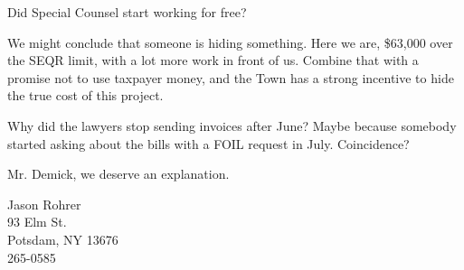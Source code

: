 \documentclass[12pt]{article}
\begin{document}
Did Special Counsel start working for free?

We might conclude that someone is hiding something.  Here we are, \$63,000 over the SEQR limit, with a lot more work in front of us.  Combine that with a promise not to use taxpayer money, and the Town has a strong incentive to hide the true cost of this project.

Why did the lawyers stop sending invoices after June?  Maybe because somebody started asking about the bills with a FOIL request in July.  Coincidence?

Mr. Demick, we deserve an explanation.

\vspace{0.5in}
\noindent Jason Rohrer\\
93 Elm St.\\
Potsdam, NY 13676\\
265-0585
\end{document}
